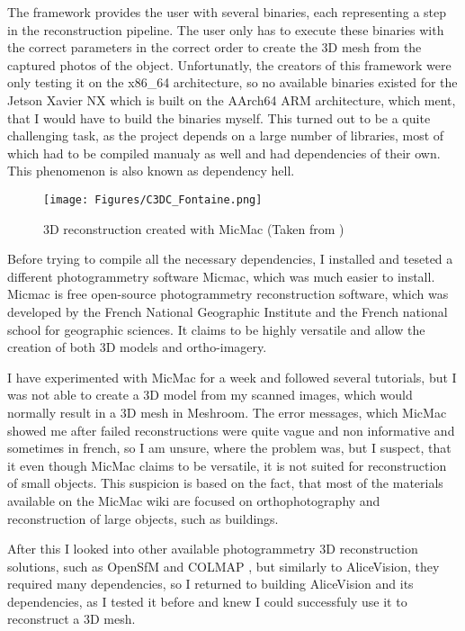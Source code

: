 The framework provides the user with several binaries, each representing a step in the reconstruction pipeline.
The user only has to execute these binaries with the correct parameters in the correct order to create the 3D mesh from the captured photos of the object.
Unfortunatly, the creators of this framework were only testing it on the x86\_64 architecture, so no available binaries existed for the Jetson Xavier NX which is built on the AArch64 ARM architecture, which ment, that I would have to build the binaries myself.
This turned out to be a quite challenging task, as the project depends on a large number of libraries, most of which had to be compiled manualy as well and had dependencies of their own.
This phenomenon is also known as dependency hell.

\begin{figure}[h!]
	\centering
	\texttt{[image: Figures/C3DC\_Fontaine.png]}	
	\caption{3D reconstruction created with MicMac (Taken from \cite{micmac_fontaine})}
\end{figure}

Before trying to compile all the necessary dependencies, I installed and teseted a different photogrammetry software Micmac, which was much easier to install.
Micmac is free open-source photogrammetry reconstruction software, which was developed by the French National Geographic Institute and the French national school for geographic sciences. \cite{micmac_2017}
It claims to be highly versatile and allow the creation of both 3D models and ortho-imagery.

I have experimented with MicMac for a week and followed several tutorials, but I was not able to create a 3D model from my scanned images, which would normally result in a 3D mesh in Meshroom.
The error messages, which MicMac showed me after failed reconstructions were quite vague and non informative and sometimes in french, so I am unsure, where the problem was, but I suspect, that it even though MicMac claims to be versatile, it is not suited for reconstruction of small objects.
This suspicion is based on the fact, that most of the materials available on the MicMac wiki are focused on orthophotography and reconstruction of large objects, such as buildings.


After this I looked into other available photogrammetry 3D reconstruction solutions, such as OpenSfM \cite{opensfm} and COLMAP \cite{schoenberger2016sfm, schoenberger2016mvs}, but similarly to AliceVision, they required many dependencies, so I returned to building AliceVision and its dependencies, as I tested it before and knew I could successfuly use it to reconstruct a 3D mesh.

